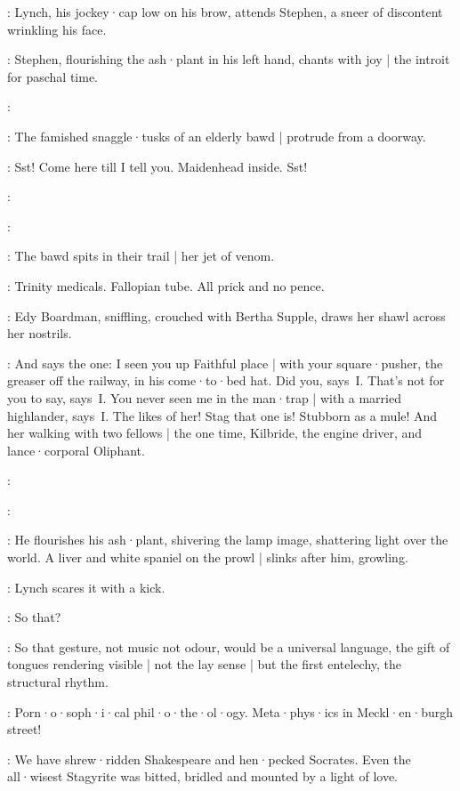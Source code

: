 :
Lynch,
his jockey·cap low on his brow,
attends Stephen,
a sneer of discontent wrinkling his face.

:
Stephen,
flourishing the ash·plant in his left hand,
chants with joy |
the introit for paschal time.

\Stephen:

:
The famished snaggle·tusks of an elderly bawd |
protrude from a doorway.

\Bawd:
Sst!
Come here till I tell you.
Maidenhead inside.
Sst!

:

\Stephen:

:
The bawd spits in their trail |
her jet of venom.

\Bawd:
Trinity medicals.
Fallopian tube.
All prick and no pence.

:
Edy Boardman,
sniffling,
crouched with Bertha Supple,
draws her shawl across her nostrils.

\Edy:
And says the one:
I seen you up Faithful place |
with your square·pusher,
the greaser off the railway,
in his come·to·bed hat.
Did you,
says~I.
That's not for you to say,
says~I.
You never seen me in the man·trap |
with a married highlander,
says~I.
The likes of her!
Stag that one is!
Stubborn as a mule!
And her walking with two fellows |
the one time,
Kilbride,
the engine driver,
and lance·corporal Oliphant.

:

\Stephen:

:
He flourishes his ash·plant,
shivering the lamp image,
shattering light over the world.
A liver and white spaniel on the prowl |
slinks after him,
growling.

:
Lynch scares it with a kick.

\Lynch:
So that?

\Stephen:
\sout{}
So that gesture,
not music not odour,
would be a universal language,
the gift of tongues rendering visible |
not the lay sense |
but the first entelechy,
the structural rhythm.

\Lynch:
Porn·o·soph·i·cal phil·o·the·ol·ogy.
Meta·phys·ics in Meckl·en·burgh street!

\Stephen:
We have shrew·ridden Shakespeare and hen·pecked Socrates.
Even the all·wisest Stagyrite was bitted,
bridled and mounted by a light of love.


